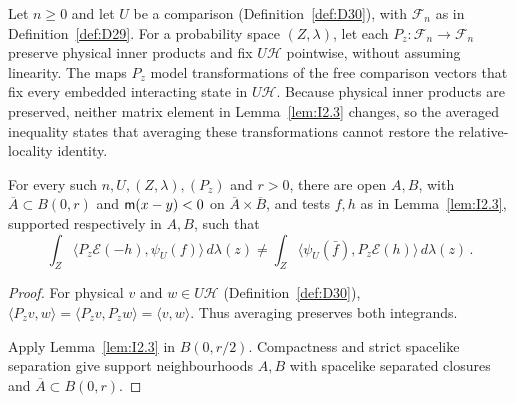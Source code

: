 Let $n\ge0$ and let $U$ be a comparison (Definition~\ref{def:D30}), with $\mathcal F_n$ as in Definition~\ref{def:D29}. For a probability space $(Z,\lambda)$, let each $P_z:\mathcal F_n\to\mathcal F_n$ preserve physical inner products and fix $U\mathcal H$ pointwise, without assuming linearity.
The maps $P_z$ model transformations of the free comparison vectors that fix every embedded interacting state in $U\mathcal H$. Because physical inner products are preserved, neither matrix element in Lemma~\ref{lem:I2.3} changes, so the averaged inequality states that averaging these transformations cannot restore the relative-locality identity.
\begin{lemma}\label{lem:I2.4}
For every such $n,U,(Z,\lambda),(P_z)$ and $r>0$, there are open $A,B$, with $\overline A\subset B(0,r)$ and $\mathsf{m}(x-y)<0$ on $\overline A\times\overline B$, and tests $f,h$ as in Lemma~\ref{lem:I2.3}, supported respectively in $A,B$, such that
\begin{equation*}
\int_Z\langle P_z\mathcal E(-h),\psi_U(f)\rangle\,d\lambda(z)
\ne\int_Z\langle\psi_U(\bar f),P_z\mathcal E(h)\rangle\,d\lambda(z)\,.
\end{equation*}
\end{lemma}
\begin{proof}
For physical $v$ and $w\in U\mathcal H$ (Definition~\ref{def:D30}), $\langle P_zv,w\rangle=\langle P_zv,P_zw\rangle=\langle v,w\rangle$.
Thus averaging preserves both integrands.

Apply Lemma~\ref{lem:I2.3} in $B(0,r/2)$. Compactness and strict spacelike separation give support neighbourhoods $A,B$ with spacelike separated closures and $\overline A\subset B(0,r)$.
\end{proof}
